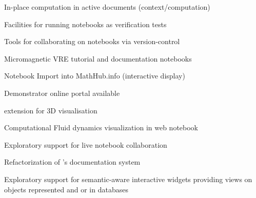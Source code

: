 \begin{workpackage}
\begin{wpdelivs}
    \begin{wpdeliv}[id=adcomp,due=18,nature=DEM,dissem=PU,lead=JU]
      {In-place computation in active documents (context/computation)}
    \end{wpdeliv}

  \begin{wpdeliv}[due=18,id=jupyter-test,dissem=PU,nature=OTHER,lead=SR]
      {Facilities for running notebooks as verification tests}
  \end{wpdeliv}

  \begin{wpdeliv}[due=12,id=jupyter-collab,dissem=PU,nature=OTHER,lead=SR]
      {Tools for collaborating on notebooks via version-control}
  \end{wpdeliv}
    \begin{wpdeliv}[due=21,id=oommf-nb-documentation,dissem=PU,nature=DEM,lead=USO]
      {Micromagnetic VRE tutorial and documentation notebooks}
    \end{wpdeliv}
    \begin{wpdeliv}[id=jupyter-import,due=24,nature=DEM,dissem=PU,lead=JU]
      {Notebook Import into MathHub.info (interactive display)}
    \end{wpdeliv}
    \begin{wpdeliv}[due=24,id=oommf-nb-tmp,dissem=PU,nature=DEC,lead=USO]
      {Demonstrator online portal available}
    \end{wpdeliv}
  \begin{wpdeliv}[due=24,id=vis3d,dissem=PU,nature=OTHER,lead=SR]
      {\Jupyter extension for 3D visualisation}
  \end{wpdeliv}
  \begin{wpdeliv}[due=36,id=cfd-vis,dissem=PU,nature=OTHER,lead=SR]
      {Computational Fluid dynamics visualization in web notebook}
  \end{wpdeliv}
  \begin{wpdeliv}[due=36,id=jupyter-live-collab,dissem=PU,nature=OTHER,lead=SR]
      {Exploratory support for live notebook collaboration}
  \end{wpdeliv}
  \begin{wpdeliv}[due=24,id=sage-sphinx,dissem=PU,nature=OTHER,lead=PS]
      {Refactorization of \Sage's \Sphinx documentation system}
  \end{wpdeliv}
  \begin{wpdeliv}[due=36,id=ipython-advanced-interacts,dissem=PU,nature=DEM,lead=PS]
      {Exploratory support for semantic-aware interactive widgets providing views on objects
      represented and or in databases}
  \end{wpdeliv}



\end{wpdelivs}
\end{workpackage}
